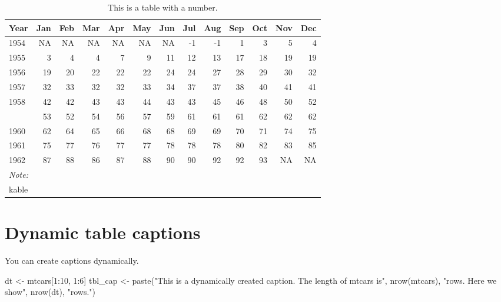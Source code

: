 \documentclass[
  letterpaper,
  oneside]{scrbook}
\newenvironment{Shaded}{\begin{snugshade}}{\end{snugshade}}
\newcommand{\DecValTok}[1]{\textcolor[rgb]{0.68,0.00,0.00}{#1}}
\newcommand{\FunctionTok}[1]{\textcolor[rgb]{0.28,0.35,0.67}{#1}}
\newcommand{\NormalTok}[1]{\textcolor[rgb]{0.00,0.23,0.31}{#1}}
\newcommand{\OtherTok}[1]{\textcolor[rgb]{0.00,0.23,0.31}{#1}}
\newcommand{\SpecialCharTok}[1]{\textcolor[rgb]{0.37,0.37,0.37}{#1}}
\newcommand{\StringTok}[1]{\textcolor[rgb]{0.13,0.47,0.30}{#1}}
\begin{document}
\hypertarget{tbl-tablabel}{}
\begin{table}
\caption{\label{tbl-tablabel}This is a table with a number. }\tabularnewline

\centering
\begin{tabular}[t]{lrrrrrrrrrrrr}
\toprule
Year & Jan & Feb & Mar & Apr & May & Jun & Jul & Aug & Sep & Oct & Nov & Dec\\
\midrule
1954 & NA & NA & NA & NA & NA & NA & -1 & -1 & 1 & 3 & 5 & 4\\
1955 & 3 & 4 & 4 & 7 & 9 & 11 & 12 & 13 & 17 & 18 & 19 & 19\\
1956 & 19 & 20 & 22 & 22 & 22 & 24 & 24 & 27 & 28 & 29 & 30 & 32\\
1957 & 32 & 33 & 32 & 32 & 33 & 34 & 37 & 37 & 38 & 40 & 41 & 41\\
1958 & 42 & 42 & 43 & 43 & 44 & 43 & 43 & 45 & 46 & 48 & 50 & 52\\
\addlinespace
1959 & 53 & 52 & 54 & 56 & 57 & 59 & 61 & 61 & 61 & 62 & 62 & 62\\
1960 & 62 & 64 & 65 & 66 & 68 & 68 & 69 & 69 & 70 & 71 & 74 & 75\\
1961 & 75 & 77 & 76 & 77 & 77 & 78 & 78 & 78 & 80 & 82 & 83 & 85\\
1962 & 87 & 88 & 86 & 87 & 88 & 90 & 90 & 92 & 92 & 93 & NA & NA\\
\bottomrule
\multicolumn{13}{l}{\rule{0pt}{1em}\textit{Note: }}\\
\multicolumn{13}{l}{\rule{0pt}{1em}kable}\\
\end{tabular}
\end{table}

\hypertarget{dynamic-table-captions}{%
\section{Dynamic table captions}\label{dynamic-table-captions}}

You can create captions dynamically.

\begin{Shaded}
\begin{Highlighting}[]
\NormalTok{dt }\OtherTok{\textless{}{-}}\NormalTok{ mtcars[}\DecValTok{1}\SpecialCharTok{:}\DecValTok{10}\NormalTok{, }\DecValTok{1}\SpecialCharTok{:}\DecValTok{6}\NormalTok{]}
\NormalTok{tbl\_cap }\OtherTok{\textless{}{-}} \FunctionTok{paste}\NormalTok{(}\StringTok{"This is a dynamically created caption. The length of mtcars is"}\NormalTok{, }\FunctionTok{nrow}\NormalTok{(mtcars), }\StringTok{"rows. Here we show"}\NormalTok{, }\FunctionTok{nrow}\NormalTok{(dt), }\StringTok{"rows."}\NormalTok{)}
\end{Highlighting}
\end{Shaded}
\end{document}
